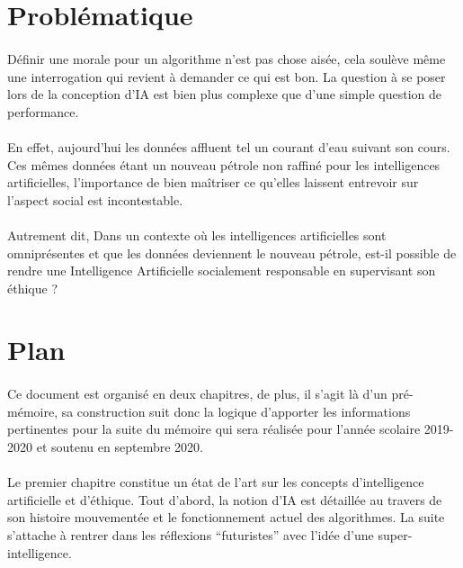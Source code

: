 \documentclass[10pt, french, a4paper]{report}
\begin{document}
\section*{Problématique} 

\paragraph{}
Définir une morale pour un algorithme n’est pas chose aisée, cela soulève même une interrogation qui revient à demander ce qui est bon. La question à se poser lors de la conception d’IA est bien plus complexe que d’une simple question de performance.

\paragraph{}
En effet, aujourd’hui les données affluent tel un courant d’eau suivant son cours. Ces mêmes données étant un nouveau pétrole non raffiné pour les intelligences artificielles, l’importance de bien maîtriser ce qu’elles laissent entrevoir sur l’aspect social est incontestable.

\paragraph{}
Autrement dit, Dans un contexte où les intelligences artificielles sont omniprésentes et que les données deviennent le nouveau pétrole, est-il possible de rendre une Intelligence Artificielle socialement responsable en supervisant son éthique ?


\section*{Plan} 

\paragraph{}
Ce document est organisé en deux chapitres, de plus, il s’agit là d’un pré-mémoire, sa construction suit donc la logique d’apporter les informations pertinentes pour la suite du mémoire qui sera réalisée pour l’année scolaire 2019-2020 et soutenu en septembre 2020.

\paragraph{}
Le premier chapitre constitue un état de l’art sur les concepts d’intelligence artificielle et d’éthique. Tout d’abord, la notion d’IA est détaillée au travers de son histoire mouvementée et le fonctionnement actuel des algorithmes. La suite s’attache à rentrer dans les réflexions ``futuristes'' avec l’idée d’une super-intelligence.
\end{document}
